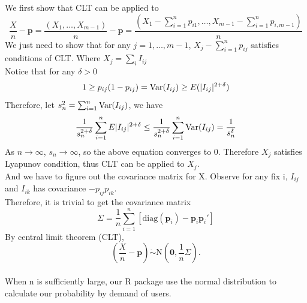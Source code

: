 \documentclass[12pt]{article}
\newcommand{\zerovec}{{\boldsymbol{0}}}
\newcommand{\Var}{{\rm Var}}
\newcommand{\N}{\textrm{N}}
\newcommand{\diag}{\textrm{diag}}
\newcommand{\pvec}{\boldsymbol{p}}
\begin{document}
We first show that CLT can be applied to
\begin{equation*}
\frac{X}{n} - \pvec = \frac{(X_1,\dots,X_{m-1})}{n} - \pvec = \frac{(X_1 - \sum_{i=1}^{n}p_{i1},\dots,X_{m-1} - \sum_{i=1}^{n}p_{i,m-1})}{n}
\end{equation*}
We just need to show that for any $j = 1,\dots,m-1$, $X_j - \sum_{i=1}^{n}p_{ij}$ satisfies conditions of CLT. Where $X_{j} = \sum_i I_{ij}$ \\
Notice that for any $\delta > 0$
\begin{equation*}
    1\geq p_{ij}(1-p_{ij}) = \Var (I_{ij}) \geq E(|I_{ij}|^{2+ \delta})
\end{equation*}
Therefore, let $s_n^2 = \sum_{i=1}^{n}\Var(I_{ij})$, we have
\begin{equation*}
    \frac{1}{s_n^{2+\delta}}\sum_{i=1}^{n}E|I_{ij}|^{2 + \delta} \leq  \frac{1}{s_n^{2+\delta}}\sum_{i=1}^{n}\Var(I_{ij}) = \frac{1}{s_n^\delta}
\end{equation*}
As $n \rightarrow \infty$, $s_n \rightarrow \infty$, so the above equation converges to 0. Therefore $X_j$ satisfies Lyapunov condition, thus CLT can be applied to $X_j$. \\
And we have to figure out the covariance matrix for X.
Observe for any fix i, $I_{ij}$ and $I_{ik}$ has covariance $-p_{ij}p_{ik}$. \\


Therefore, it is trivial to get the covariance matrix $$\Sigma=\frac{1}{n}\sum_{i=1}^n[\diag(\pvec_i)-\pvec_i\pvec_i']$$
By central limit theorem (CLT),
$$\left(\frac{X}{n}-\pvec\right)\dot\sim \N\left(\zerovec, \frac{1}{n}\Sigma\right).$$\\

When n is sufficiently large, our R package use the normal distribution to calculate our probability by demand of users.


\end{document}
